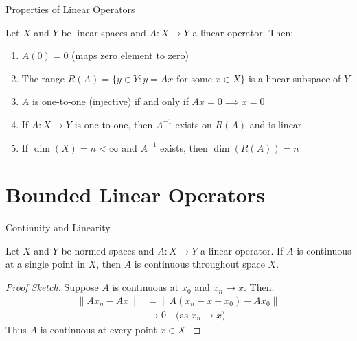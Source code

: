 \documentclass[aspectratio=169,10pt]{beamer}
\begin{document}
\begin{frame}{Properties of Linear Operators}
    \begin{theorem}[Proposition 1.7]
        Let $X$ and $Y$ be linear spaces and $A : X \to Y$ a linear operator. Then:
    \end{theorem}

    \begin{enumerate}
        \item $A(0) = 0$ (maps zero element to zero)

        \item The range $R(A) = \{y \in Y : y = Ax \text{ for some } x \in X\}$ is a linear subspace of $Y$

        \item $A$ is one-to-one (injective) if and only if $Ax = 0 \implies x = 0$

        \item If $A : X \to Y$ is one-to-one, then $A^{-1}$ exists on $R(A)$ and is linear

        \item If $\dim(X) = n < \infty$ and $A^{-1}$ exists, then $\dim(R(A)) = n$
    \end{enumerate}
\end{frame}

\section{Bounded Linear Operators}

\begin{frame}{Continuity and Linearity}
    \begin{theorem}[Theorem 1.12]
        Let $X$ and $Y$ be normed spaces and $A : X \to Y$ a linear operator. If $A$ is continuous at a single point in $X$, then $A$ is continuous throughout space $X$.
    \end{theorem}

    \vspace{0.5cm}

    \begin{proof}[Proof Sketch]
        Suppose $A$ is continuous at $x_0$ and $x_n \to x$. Then:
        \begin{align*}
            \|Ax_n - Ax\| &= \|A(x_n - x + x_0) - Ax_0\| \\
            &\to 0 \quad \text{(as $x_n \to x$)}
        \end{align*}
        Thus $A$ is continuous at every point $x \in X$.
    \end{proof}
\end{frame}
\end{document}
